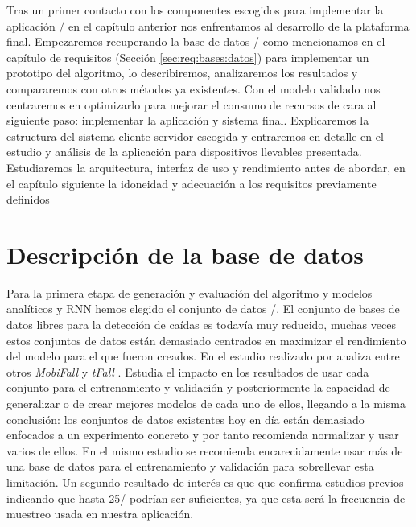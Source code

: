 
Tras un primer contacto con los componentes escogidos para implementar la aplicación \accelcapture/ en el capítulo anterior nos enfrentamos al desarrollo de la plataforma final. Empezaremos recuperando la base de datos \sisfall/  como mencionamos en el capítulo de requisitos (Sección \ref{sec:req:bases:datos}) para implementar un prototipo del algoritmo, lo describiremos, analizaremos los resultados y compararemos con otros métodos ya existentes. Con el modelo validado nos centraremos en optimizarlo para mejorar el consumo de recursos de cara al siguiente paso: implementar la aplicación y sistema final. Explicaremos la estructura del sistema cliente-servidor escogida y entraremos en detalle en el estudio y análisis de la aplicación para dispositivos llevables presentada. Estudiaremos la arquitectura, interfaz de uso y rendimiento antes de abordar, en el capítulo siguiente la idoneidad y adecuación a los requisitos previamente definidos 

\section{Descripción de la base de datos}

Para la primera etapa de generación y evaluación del algoritmo y modelos analíticos y RNN hemos elegido el conjunto de datos \sisfall/. El conjunto de bases de datos libres para la detección de caídas es todavía muy reducido, muchas veces estos conjuntos de datos están demasiado centrados en maximizar el rendimiento del modelo para el que fueron creados. En el estudio realizado por  analiza entre otros \textit{MobiFall} \cite{MobiFall} y \textit{tFall} \cite{tfall}. Estudia el impacto en los resultados de usar cada conjunto para el entrenamiento y validación y posteriormente la capacidad de generalizar o de crear mejores modelos de cada uno de ellos, llegando a la misma conclusión: los conjuntos de datos existentes hoy en día están demasiado enfocados a un experimento concreto y por tanto recomienda normalizar y usar varios de ellos. En el mismo estudio se recomienda encarecidamente usar más de una base de datos para el entrenamiento y validación para sobrellevar esta limitación. Un segundo resultado de interés es que  que confirma estudios previos indicando que hasta 25\hz/ podrían ser suficientes, ya que esta será la frecuencia de muestreo usada en nuestra aplicación.


